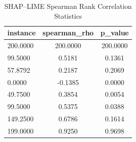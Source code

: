 \begin{table}
\centering
\caption{SHAP–LIME Spearman Rank Correlation Statistics}
\label{tab:agreement}
\begin{tabular}{lcc}
\toprule
instance & spearman_rho & p_value \\
\midrule
200.0000 & 200.0000 & 200.0000 \\
99.5000 & 0.5181 & 0.1361 \\
57.8792 & 0.2187 & 0.2069 \\
0.0000 & -0.1385 & 0.0000 \\
49.7500 & 0.3854 & 0.0054 \\
99.5000 & 0.5375 & 0.0388 \\
149.2500 & 0.6786 & 0.1614 \\
199.0000 & 0.9250 & 0.9698 \\
\bottomrule
\end{tabular}
\end{table}
